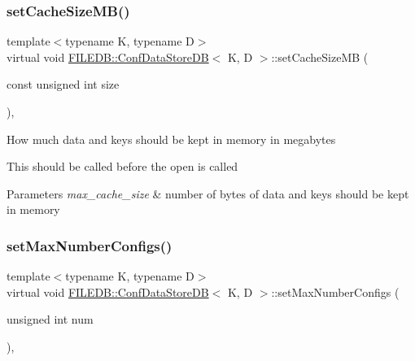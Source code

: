 \subsubsection{\texorpdfstring{setCacheSizeMB()}{setCacheSizeMB()}\hspace{0.1cm}{\footnotesize\ttfamily [2/2]}}
{\footnotesize\ttfamily template$<$typename K, typename D$>$ \\
virtual void \mbox{\hyperlink{classFILEDB_1_1ConfDataStoreDB}{F\+I\+L\+E\+D\+B\+::\+Conf\+Data\+Store\+DB}}$<$ K, D $>$\+::set\+Cache\+Size\+MB (\begin{DoxyParamCaption}\item[{const unsigned int}]{size }\end{DoxyParamCaption})\hspace{0.3cm}{\ttfamily [inline]}, {\ttfamily [virtual]}}

How much data and keys should be kept in memory in megabytes

This should be called before the open is called 
\begin{DoxyParams}{Parameters}
{\em max\+\_\+cache\+\_\+size} & number of bytes of data and keys should be kept in memory \\
\hline
\end{DoxyParams}
\mbox{\label{classFILEDB_1_1ConfDataStoreDB_acd6f44fc7a83322417ad1a7ea7d2b6ea}} 
\subsubsection{\texorpdfstring{setMaxNumberConfigs()}{setMaxNumberConfigs()}\hspace{0.1cm}{\footnotesize\ttfamily [1/2]}}
{\footnotesize\ttfamily template$<$typename K, typename D$>$ \\
virtual void \mbox{\hyperlink{classFILEDB_1_1ConfDataStoreDB}{F\+I\+L\+E\+D\+B\+::\+Conf\+Data\+Store\+DB}}$<$ K, D $>$\+::set\+Max\+Number\+Configs (\begin{DoxyParamCaption}\item[{unsigned int}]{num }\end{DoxyParamCaption})\hspace{0.3cm}{\ttfamily [inline]}, {\ttfamily [virtual]}}

